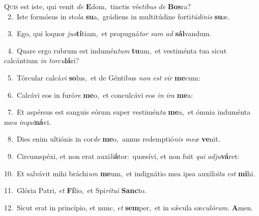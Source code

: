 \lettrine{\initial\textcolor{\initialcolor}{Q}}{uis} est iste, qui venit \textit{de} \textbf{E}\-dom,~\star tinctis vés\-\textit{ti}\-\textit{bus} \textit{de} \textbf{Bos}\-ra?\\
{\numbfont\textcolor{\numbcolor}{~2.}}~Iste formósus in sto\textit{la} \textbf{su}\-a,~\star grádiens in multitúdine forti\-\textit{tú}\-\textit{di}\textit{nis} \textbf{su}\-æ.\par
{\numbfont\textcolor{\numbcolor}{~3.}}~Ego, qui loquor \textit{jus}\-\textbf{tí}tiam,~\star et propugná\textit{tor} \textit{sum} \textit{ad} \textbf{sál}\-vandum.\par
{\numbfont\textcolor{\numbcolor}{~4.}}~Quare ergo rubrum est indumén\textit{tum} \textbf{tu}\-um,~\star et vestiménta tua sicut calcántium \textit{in} \textit{tor}\-\textit{cu}\textbf{lá}ri?\par
{\numbfont\textcolor{\numbcolor}{~5.}}~Tórcular calcá\textit{vi} \textbf{so}\-lus,~\star et de Géntibus \textit{non} \textit{est} \textit{vir} \textbf{me}\-cum:\par
{\numbfont\textcolor{\numbcolor}{~6.}}~Calcávi eos in furó\textit{re} \textbf{me}\-o,~\star et conculcávi eos \textit{in} \textit{i}\-\textit{ra} \textbf{me}\-a:\par
{\numbfont\textcolor{\numbcolor}{~7.}}~Et aspérsus est sanguis eórum super vestimén\textit{ta} \textbf{me}\-a,~\star et ómnia induménta me\textit{a} \textit{in}\-\textit{qui}\textbf{ná}vi.\par
{\numbfont\textcolor{\numbcolor}{~8.}}~Dies enim ultiónis in cor\textit{de} \textbf{me}\-o,~\star annus redemptió\textit{nis} \textit{me}\-\textit{æ} \textbf{ve}\-nit.\par
{\numbfont\textcolor{\numbcolor}{~9.}}~Circumspéxi, et non erat auxi\-\textit{li}\-\textbf{á}tor:~\star quæsívi, et non fuit \textit{qui} \textit{ad}\-\textit{ju}\textbf{vá}ret:\par
{\numbfont\textcolor{\numbcolor}{10.}}~Et salvávit mihi bráchi\textit{um} \textbf{me}\-um,~\star et indignátio mea ipsa auxili\-\textit{á}\-\textit{ta} \textit{est} \textbf{mi}\-hi.\par
{\numbfont\textcolor{\numbcolor}{11.}}~Glória Patri, \textit{et} \textbf{Fí}\-lio,~\star et Spi\-\textit{rí}\-\textit{tu}\textit{i} \textbf{Sanc}\-to.\par
{\numbfont\textcolor{\numbcolor}{12.}}~Sicut erat in princípio, et nunc, \textit{et} \textbf{sem}\-per,~\star et in sǽcula sæ\-\textit{cu}\-\textit{ló}\textit{rum}. \textbf{A}\-men.\par
